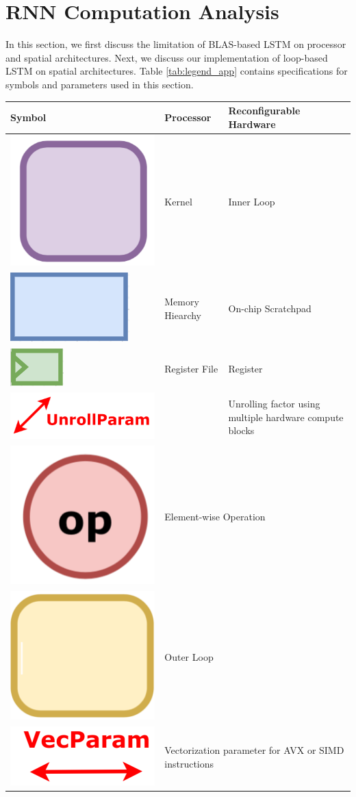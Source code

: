 \section{RNN Computation Analysis} 
\label{sec:app}
In this section, we first discuss the limitation of BLAS-based LSTM on processor and spatial architectures.
Next, we discuss our implementation of loop-based LSTM on spatial architectures.
Table \ref{tab:legend_app} contains specifications for symbols and parameters
  used in this section.
\begin{table}[t]
  \vskip 0.15in
  \centering
  \scriptsize
  \begin{tabular}{p{0.6cm}m{3cm}m{3cm}}
  \toprule
    Symbol & Processor & Reconfigurable Hardware \\
    \midrule
    \includegraphics[width=0.03\columnwidth]{figs/innerloop.png} & Kernel & Inner Loop \\
    \includegraphics[width=0.03\columnwidth]{figs/onchip.png} & Memory Hiearchy & On-chip Scratchpad \\
    \includegraphics[width=0.03\columnwidth]{figs/reg.png} & Register File & Register \\
    \includegraphics[width=0.1\columnwidth]{figs/unrollparm.png} & & Unrolling factor using multiple hardware compute blocks \\ \midrule
    \includegraphics[width=0.03\columnwidth]{figs/vec.png} & \multicolumn{2}{L{6.5cm}}{Element-wise Operation} \\
    \includegraphics[width=0.03\columnwidth]{figs/outerloop.png} & \multicolumn{2}{L{6.5cm}}{Outer Loop} \\
    \includegraphics[width=0.1\columnwidth]{figs/vecparam.png} & \multicolumn{2}{L{6.5cm}}{Vectorization parameter for AVX or SIMD instructions} \\

\end{tabular}
\end{table}
